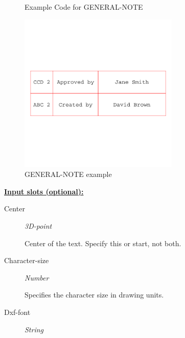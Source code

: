 \documentclass [11pt]{book}
\begin{document}
\begin{itemize}
\begin{figure}
\begin{lrbox}{\boxedverb}
\begin{minipage}{\linewidth}
{\begin{verbatim}
\end{verbatim}}
\end{minipage}
\end{lrbox}
\fbox{\usebox{\boxedverb}}

\caption{Example Code for GENERAL-NOTE}

\label{fig:example-code-GENERAL-NOTE}

\end{figure}

\begin{figure}
\begin{center}
\includegraphics[width=3in,height=3in]{../images/example-general-note.pdf}
\end{center}

\caption{GENERAL-NOTE example}

\label{fig:GENERAL-NOTE}

\end{figure}





\textbf{
\underline{Input slots (optional):}}

\begin{description}

\item [Center]
\emph{3D-point}

 Center of the text. Specify this or start, not both.




\item [Character-size]
\emph{Number}

 Specifies the character size in drawing units.




\item [Dxf-font]
\emph{String}


\end{description}
\end{itemize}
\end{document}
